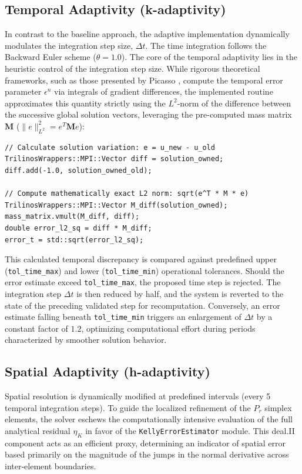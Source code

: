 \documentclass[
  11pt,
]{article}
\begin{document}
\subsection{Temporal Adaptivity (k-adaptivity)}

In contrast to the baseline approach, the adaptive implementation dynamically modulates the integration step size, $\Delta t$. The time integration follows the Backward Euler scheme ($\theta = 1.0$). The core of the temporal adaptivity lies in the heuristic control of the integration step size. While rigorous theoretical frameworks, such as those presented by Picasso \cite{picasso1998}, compute the temporal error parameter $\epsilon^n$ via integrals of gradient differences, the implemented routine approximates this quantity strictly using the $L^2$-norm of the difference between the successive global solution vectors, leveraging the pre-computed mass matrix $\mathbf{M}$ ($\|e\|_{L^2}^2 = e^T \mathbf{M} e$):

\begin{verbatim}
// Calculate solution variation: e = u_new - u_old
TrilinosWrappers::MPI::Vector diff = solution_owned;
diff.add(-1.0, solution_owned_old);

// Compute mathematically exact L2 norm: sqrt(e^T * M * e)
TrilinosWrappers::MPI::Vector M_diff(solution_owned);
mass_matrix.vmult(M_diff, diff); 
double error_l2_sq = diff * M_diff; 
error_t = std::sqrt(error_l2_sq);
\end{verbatim}

This calculated temporal discrepancy is compared against predefined upper (\texttt{tol\_time\_max}) and lower (\texttt{tol\_time\_min}) operational tolerances. Should the error estimate exceed \texttt{tol\_time\_max}, the proposed time step is rejected. The integration step $\Delta t$ is then reduced by half, and the system is reverted to the state of the preceding validated step for recomputation. Conversely, an error estimate falling beneath \texttt{tol\_time\_min} triggers an enlargement of $\Delta t$ by a constant factor of $1.2$, optimizing computational effort during periods characterized by smoother solution behavior.

\subsection{Spatial Adaptivity (h-adaptivity)}

Spatial resolution is dynamically modified at predefined intervals (every 5 temporal integration steps). To guide the localized refinement of the $P_r$ simplex elements, the solver eschews the computationally intensive evaluation of the full analytical residual $\eta_K$ in favor of the \texttt{KellyErrorEstimator} module. This deal.II component acts as an efficient proxy, determining an indicator of spatial error based primarily on the magnitude of the jumps in the normal derivative across inter-element boundaries.
\end{document}
